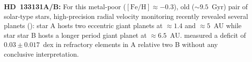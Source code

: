 \documentclass[modern, letterpaper]{aastex61}
\newcommand*\elem[1]{\ensuremath{\mathrm{#1}}}
\newcommand*\elemH[1]{\ensuremath{[\mathrm{#1}/\elem{H}]}}
\newcommand*{\feh}{\ensuremath{\elemH{Fe}}}
\begin{document}
{\bf HD~133131A/B:}
For this metal-poor ($\feh\approx -0.3$), old ($\sim 9.5$~Gyr) pair of
solar-type stars, high-precision radial velocity monitoring recently revealed
several planets (\citealt{Teske:2016ab}): star A hosts two eccentric giant
planets at $\approx 1.4$ and $\approx 5$~AU while star star B hosts a longer
period giant planet at $\approx 6.5$~AU.
\citealt{Teske:2016ab} measured a deficit of $0.03 \pm 0.017$~dex in
refractory elements in A relative two B without any conclusive interpretation.
\end{document}
